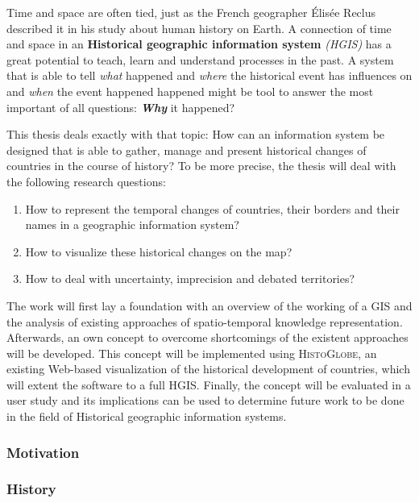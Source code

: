 Time and space are often tied, just as the French geographer Élisée Reclus described it in his study about human history on Earth. A connection of time and space in an \textbf{Historical geographic information system} \emph{(HGIS)} has a great potential to teach, learn and understand processes in the past. A system that is able to tell \emph{what} happened and \emph{where} the historical event has influences on and \emph{when} the event happened happened might be tool to answer the most important of all questions: \textbf{\emph{Why}} it happened?

This thesis deals exactly with that topic: How can an information system be designed that is able to gather, manage and present historical changes of countries in the course of history? To be more precise, the thesis will deal with the following research questions:

\begin{enumerate}
  \item How to represent the temporal changes of countries, their borders and their names in a geographic information system?
  \item How to visualize these historical changes on the map?
  \item How to deal with uncertainty, imprecision and debated territories?
\end{enumerate}

The work will first lay a foundation with an overview of the working of a GIS and the analysis of existing approaches of spatio-temporal knowledge representation. Afterwards, an own concept to overcome shortcomings of the existent approaches will be developed. This concept will be implemented using \textsc{HistoGlobe}, an existing Web-based visualization of the historical development of countries, which will extent the software to a full HGIS. Finally, the concept will be evaluated in a user study and its implications can be used to determine future work to be done in the field of Historical geographic information systems.

\subsubsection{Motivation} %
\label{ssub:motivation}



\subsubsection{History} %
\label{ssub:history}

